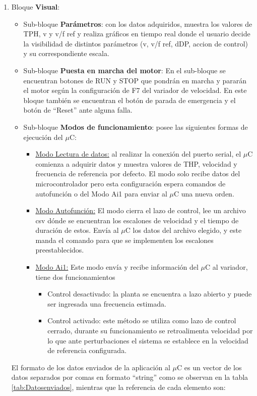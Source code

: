 \begin{enumerate}
\item Bloque \textbf{Visual}: 
\begin{itemize}
\item Sub-bloque \textbf{Parámetros}: con los datos adquiridos, muestra los valores de TPH, v y v/f ref y realiza gráficos en tiempo real donde el usuario decide la visibilidad de distintos parámetros (v, v/f ref, dDP, accion de control) y su correspondiente escala. 
\item Sub-bloque \textbf{Puesta en marcha del motor}: En el sub-bloque se encuentran botones de RUN y STOP que pondrán en marcha y pararán el motor según la configuración de F7 del variador de velocidad. En este bloque también se encuentran el botón de parada de emergencia y el botón de “Reset” ante alguna falla. 
\item Sub-bloque \textbf{Modos de funcionamiento}: posee las siguientes formas de ejecución del $\mu$C:
\begin{itemize}
\item \underline{Modo Lectura de datos:} al realizar la conexión del puerto serial, el $\mu$C comienza a adquirir datos y muestra valores de THP, velocidad y frecuencia de referencia por defecto. El modo solo recibe datos del microcontrolador pero esta configuración espera comandos de autofunción o del Modo Ai1 para enviar al $\mu$C una nueva orden.
\item \underline{Modo Autofunción:} El modo cierra el lazo de control, lee un archivo csv dónde se encuentran los escalones de velocidad y el tiempo de duración de estos. Envía al $\mu$C los datos del archivo elegido, y este manda el
comando para que se implementen los escalones preestablecidos.

\item \underline{Modo Ai1:} Este modo envía y recibe información del $\mu$C al variador, tiene dos funcionamientos
\begin{itemize}
\item Control desactivado: la planta se encuentra a lazo abierto y puede ser ingresada una frecuencia estimada.
\item Control activado: este método se utiliza como lazo de control cerrado, durante su funcionamiento se retroalimenta velocidad por lo que ante perturbaciones el sistema se establece en la velocidad de referencia configurada.
\end{itemize}
\end{itemize}
\end{itemize}


El formato de los datos enviados de la aplicación al $\mu$C es un vector de los datos separados por comas en formato “string” como se observan en la tabla \ref{tab:Datosenviados}, mientras que la referencia de cada elemento son:


\end{enumerate}
